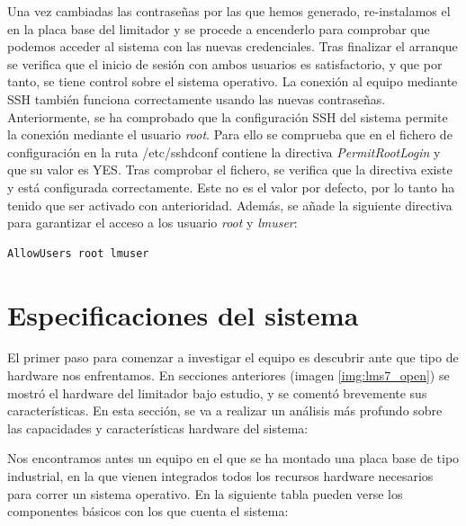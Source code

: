 Una vez cambiadas las contraseñas por las que hemos generado, re-instalamos el  en la placa base del limitador y se procede a encenderlo para comprobar que podemos acceder al sistema con las nuevas credenciales. Tras finalizar el arranque se verifica que el inicio de sesión con ambos usuarios es satisfactorio, y que por tanto, se tiene control sobre el sistema operativo. La conexión al equipo mediante \acrshort{SSH} también funciona correctamente usando las nuevas contraseñas. Anteriormente, se ha comprobado que la configuración \acrshort{SSH} del sistema permite la conexión mediante el usuario \textit{root}. Para ello se comprueba que en el fichero de configuración en la ruta /etc/sshd\textunderscore conf contiene la directiva \textit{PermitRootLogin} y que su valor es YES. Tras comprobar el fichero, se verifica que la directiva existe y está configurada correctamente. Este no es el valor por defecto, por lo tanto ha tenido que ser activado con anterioridad. Además, se añade la siguiente directiva para garantizar el acceso a los usuario \textit{root} y \textit{lmuser}: \newline

\begin{lstlisting}[nolol, language=XML, label={lst:confSSH}, caption={Directiva del fichero}]
    AllowUsers root lmuser
\end{lstlisting}

\section{Especificaciones del sistema}

El primer paso para comenzar a investigar el equipo es descubrir ante que tipo de hardware nos enfrentamos. En secciones anteriores (imagen \ref{img:lms7_open}) se mostró el hardware del limitador bajo estudio, y se comentó brevemente sus características. En esta sección, se va a realizar un análisis más profundo sobre las capacidades y características hardware del sistema:

Nos encontramos antes un equipo en el que se ha montado una placa base de tipo industrial, en la que vienen integrados todos los recursos hardware necesarios para correr un sistema operativo. En la siguiente tabla pueden verse los componentes básicos con los que cuenta el sistema:

